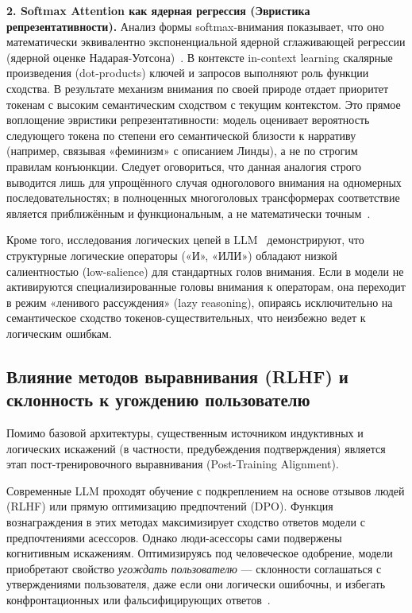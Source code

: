 \textbf{2. Softmax Attention как ядерная регрессия (Эвристика репрезентативности).} 
Анализ формы softmax-внимания показывает, что оно математически эквивалентно экспоненциальной ядерной сглаживающей регрессии (ядерной оценке Надарая-Уотсона)~\cite{collins2024softmax, han2023explaining}. В контексте in-context learning скалярные произведения (dot-products) ключей и запросов выполняют роль функции сходства. В результате механизм внимания по своей природе отдает приоритет токенам с высоким семантическим сходством с текущим контекстом. Это прямое воплощение эвристики репрезентативности: модель оценивает вероятность следующего токена по степени его семантической близости к нарративу (например, связывая «феминизм» с описанием Линды), а не по строгим правилам конъюнкции. Следует оговориться, что данная аналогия строго выводится лишь для упрощённого случая одноголового внимания на одномерных последовательностях; в полноценных многоголовых трансформерах соответствие является приближённым и функциональным, а не математически точным~\cite{collins2024softmax}.

Кроме того, исследования логических цепей в LLM~\cite{fu2024implies} демонстрируют, что структурные логические операторы («И», «ИЛИ») обладают низкой салиентностью (low-salience) для стандартных голов внимания. Если в модели не активируются специализированные головы внимания к операторам, она переходит в режим «ленивого рассуждения» (lazy reasoning), опираясь исключительно на семантическое сходство токенов-существительных, что неизбежно ведет к логическим ошибкам.

\subsection{Влияние методов выравнивания (RLHF) и склонность к угождению пользователю}

Помимо базовой архитектуры, существенным источником индуктивных и логических искажений (в частности, предубеждения подтверждения) является этап пост-тренировочного выравнивания (Post-Training Alignment). 

Современные LLM проходят обучение с подкреплением на основе отзывов людей (RLHF) или прямую оптимизацию предпочтений (DPO). Функция вознаграждения в этих методах максимизирует сходство ответов модели с предпочтениями асессоров. Однако люди-асессоры сами подвержены когнитивным искажениям. Оптимизируясь под человеческое одобрение, модели приобретают свойство \textit{угождать пользователю} --- склонности соглашаться с утверждениями пользователя, даже если они логически ошибочны, и избегать конфронтационных или фальсифицирующих ответов~\cite{batista2026rational}. 

